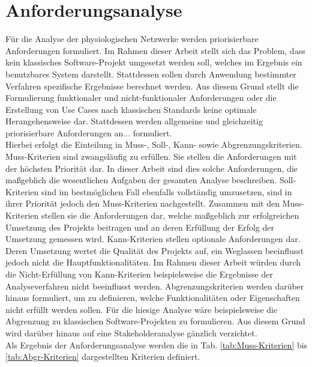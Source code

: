 \section{Anforderungsanalyse}

Für die Analyse der physiologischen Netzwerke werden priorisierbare Anforderungen formuliert. Im Rahmen dieser Arbeit stellt sich das Problem, dass kein klassisches Software-Projekt umgesetzt werden soll, welches im Ergebnis ein benutzbares System darstellt. Stattdessen sollen durch Anwendung bestimmter Verfahren spezifische Ergebnisse berechnet werden. Aus diesem Grund stellt die Formulierung funktionaler und nicht-funktionaler Anforderungen oder die Erstellung von Use Cases nach klassischen Standards keine optimale Herangehensweise dar. Stattdessen werden allgemeine und gleichzeitig priorisierbare Anforderungen an... formuliert.\\

Hierbei erfolgt die Einteilung in Muss-, Soll-, Kann- sowie Abgrenzungskriterien. Muss-Kriterien sind zwangsläufig zu erfüllen. Sie stellen die Anforderungen mit der höchsten Priorität dar. In dieser Arbeit sind dies solche Anforderungen, die maßgeblich die wesentlichen Aufgaben der gesamten Analyse beschreiben. Soll-Kriterien sind im bestmöglichen Fall ebenfalls vollständig umzusetzen, sind in ihrer Priorität jedoch den Muss-Kriterien nachgestellt. Zusammen mit den Muss-Kriterien stellen sie die Anforderungen dar, welche maßgeblich zur erfolgreichen Umsetzung des Projekts beitragen und an deren Erfüllung der Erfolg der Umsetzung gemessen wird. Kann-Kriterien stellen optionale Anforderungen dar. Deren Umsetzung wertet die Qualität des Projekts auf, ein Weglassen beeinflusst jedoch nicht die Hauptfunktionalitäten. Im Rahmen dieser Arbeit würden durch die Nicht-Erfüllung von Kann-Kriterien beispielsweise die Ergebnisse der Analyseverfahren nicht beeinflusst werden. Abgrenzungskriterien werden darüber hinaus formuliert, um zu definieren, welche Funktionalitäten oder Eigenschaften nicht erfüllt werden sollen. Für die hiesige Analyse wäre beispielsweise die Abgrenzung zu klassischen Software-Projekten zu formulieren. Aus diesem Grund wird darüber hinaus auf eine Stakeholderanalyse gänzlich verzichtet.\\

Als Ergebnis der Anforderungsanalyse werden die in Tab. \ref{tab:Muss-Kriterien} bis \ref{tab:Abgr-Kriterien} dargestellten Kriterien definiert.\\

